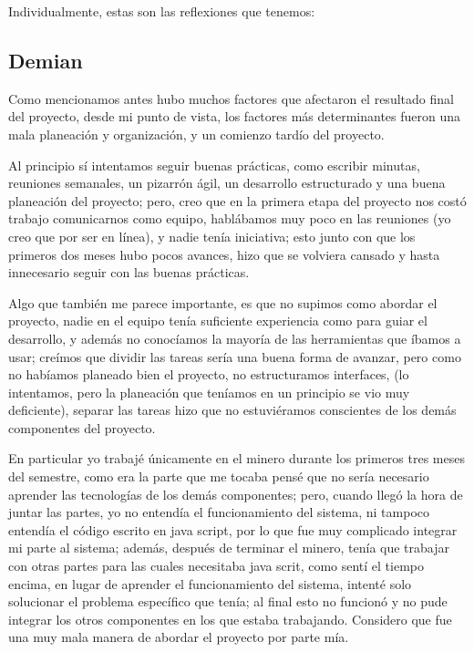 \documentclass[12pt]{article}
\newcounter{ni}
\begin{document}
\vspace{1cm}
Individualmente, estas son las reflexiones que tenemos:

\subsection{Demian}

Como mencionamos antes hubo muchos factores que afectaron el resultado final del proyecto, desde mi punto de vista, los factores más determinantes fueron una mala planeación y organización, y un comienzo tardío del proyecto.

Al principio sí intentamos seguir buenas prácticas, como escribir minutas, reuniones semanales, un pizarrón ágil, un desarrollo estructurado y una buena planeación del proyecto; pero, creo que en la primera etapa del proyecto nos costó trabajo comunicarnos como equipo, hablábamos muy poco en las reuniones (yo creo que por ser en línea), y nadie tenía iniciativa; esto junto con que los primeros dos meses hubo pocos avances, hizo que se volviera cansado y hasta innecesario seguir con las buenas prácticas.

Algo que también me parece importante, es que no supimos como abordar el proyecto, nadie en el equipo tenía suficiente experiencia como para guiar el desarrollo, y además no conocíamos la mayoría de las herramientas que íbamos a usar; creímos que dividir las tareas sería una buena forma de avanzar, pero como no habíamos planeado bien el proyecto, no estructuramos interfaces, (lo intentamos, pero la planeación que teníamos en un principio se vio muy deficiente), separar las tareas hizo que no estuviéramos conscientes de los demás componentes del proyecto.

En particular yo trabajé únicamente en el minero durante los primeros tres meses del semestre, como era la parte que me tocaba pensé que no sería necesario aprender las tecnologías de los demás componentes; pero, cuando llegó la hora de juntar las partes, yo no entendía el funcionamiento del sistema, ni tampoco entendía el código escrito en java script, por lo que fue muy complicado integrar mi parte al sistema; además, después de terminar el minero, tenía que trabajar con otras partes para las cuales necesitaba java scrit, como sentí el tiempo encima, en lugar de aprender el funcionamiento del sistema, intenté solo solucionar el problema específico que tenía; al final esto no funcionó y no pude integrar los otros componentes en los que estaba trabajando. Considero que fue una muy mala manera de abordar el proyecto por parte mía.
\end{document}
